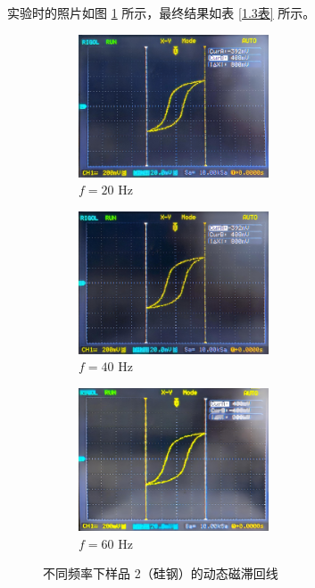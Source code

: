 \documentclass[UTF8]{article}
\theoremstyle{MyLineTheoremStyle} %
\theoremstyle{MyBlockTheoremStyle} %
\theoremstyle{MySubsubsectionStyle} %
\begin{document}
实验时的照片如图 \ref{1.3图} 所示，最终结果如表 \ref{1.3表} 所示。
\begin{figure}[H]\centering
\begin{subfigure}[b]{0.33\columnwidth}\centering
    \includegraphics[height=120pt]{assets/1.3/IMG_1793.JPG}
    \caption{$f = 20$ Hz}
\end{subfigure}\hfill
\begin{subfigure}[b]{0.33\columnwidth}\centering
    \includegraphics[height=120pt]{assets/1.3/IMG_1792.JPG}
    \caption{$f = 40$ Hz}
\end{subfigure}
\begin{subfigure}[b]{0.33\columnwidth}\centering
    \includegraphics[height=120pt]{assets/1.3/IMG_1791.JPG}
    \caption{$f = 60$ Hz}
\end{subfigure}
\caption{不同频率下样品 2（硅钢）的动态磁滞回线}\label{1.3图}
\end{figure}
\end{document}
